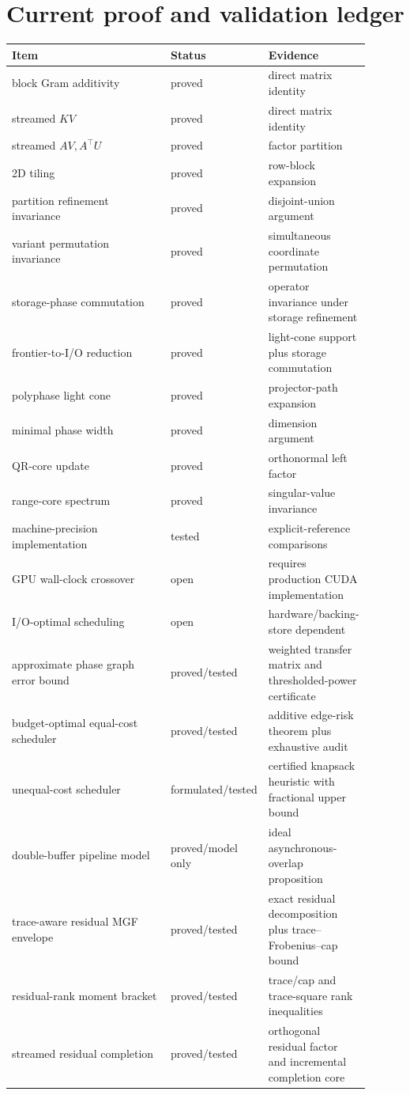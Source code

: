 \documentclass[11pt]{article}
\theoremstyle{definition}
\theoremstyle{remark}
\begin{document}
\section{Current proof and validation ledger}

\small
\begin{tabular}{p{0.46\linewidth}p{0.18\linewidth}p{0.26\linewidth}}
\toprule
Item & Status & Evidence\\
\midrule
block Gram additivity & proved & direct matrix identity\\
streamed \(KV\) & proved & direct matrix identity\\
streamed \(AV,A^\top U\) & proved & factor partition\\
2D tiling & proved & row-block expansion\\
partition refinement invariance & proved & disjoint-union argument\\
variant permutation invariance & proved & simultaneous coordinate permutation\\
storage-phase commutation & proved & operator invariance under storage refinement\\
frontier-to-I/O reduction & proved & light-cone support plus storage commutation\\
polyphase light cone & proved & projector-path expansion\\
minimal phase width & proved & dimension argument\\
QR-core update & proved & orthonormal left factor\\
range-core spectrum & proved & singular-value invariance\\
machine-precision implementation & tested & explicit-reference comparisons\\
GPU wall-clock crossover & open & requires production CUDA implementation\\
I/O-optimal scheduling & open & hardware/backing-store dependent\\
approximate phase graph error bound & proved/tested & weighted transfer matrix and thresholded-power certificate\\
budget-optimal equal-cost scheduler & proved/tested & additive edge-risk theorem plus exhaustive audit\\
unequal-cost scheduler & formulated/tested & certified knapsack heuristic with fractional upper bound\\
double-buffer pipeline model & proved/model only & ideal asynchronous-overlap proposition\\
trace-aware residual MGF envelope & proved/tested & exact residual decomposition plus trace--Frobenius--cap bound\\
residual-rank moment bracket & proved/tested & trace/cap and trace-square rank inequalities\\
streamed residual completion & proved/tested & orthogonal residual factor and incremental completion core\\
\bottomrule
\end{tabular}
\normalsize
\end{document}

